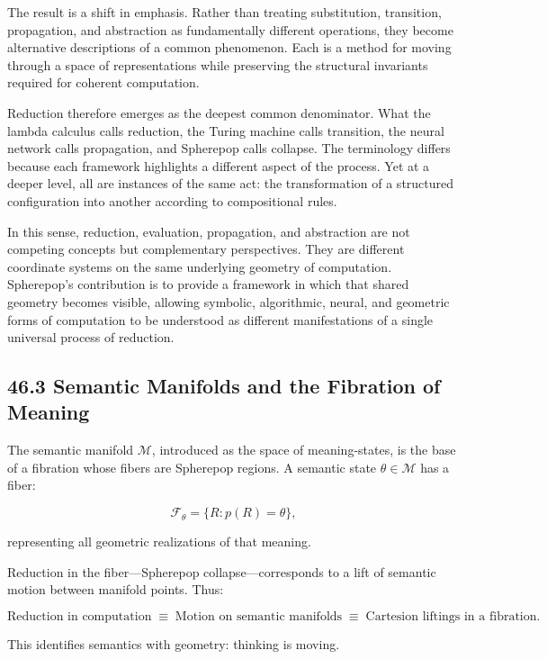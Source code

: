 \documentclass[12pt,letterpaper]{article}
\theoremstyle{remark}
\begin{document}
The result is a shift in emphasis. Rather than treating substitution, transition, propagation, and abstraction as fundamentally different operations, they become alternative descriptions of a common phenomenon. Each is a method for moving through a space of representations while preserving the structural invariants required for coherent computation.

Reduction therefore emerges as the deepest common denominator. What the lambda calculus calls reduction, the Turing machine calls transition, the neural network calls propagation, and Spherepop calls collapse. The terminology differs because each framework highlights a different aspect of the process. Yet at a deeper level, all are instances of the same act: the transformation of a structured configuration into another according to compositional rules.

In this sense, reduction, evaluation, propagation, and abstraction are not competing concepts but complementary perspectives. They are different coordinate systems on the same underlying geometry of computation. Spherepop's contribution is to provide a framework in which that shared geometry becomes visible, allowing symbolic, algorithmic, neural, and geometric forms of computation to be understood as different manifestations of a single universal process of reduction.

\subsection{46.3 Semantic Manifolds and the Fibration of Meaning}

The semantic manifold $\mathcal{M}$, introduced as the space of meaning-states,
is the base of a fibration whose fibers are Spherepop regions.  
A semantic state $\theta \in \mathcal{M}$ has a fiber:

\[
\mathcal{F}_\theta = \{ R : p(R) = \theta \},
\]

representing all geometric realizations of that meaning.

Reduction in the fiber—Spherepop collapse—corresponds to a lift of semantic motion 
between manifold points.  
Thus:

\[
\text{Reduction in computation}
\;\equiv\;
\text{Motion on semantic manifolds}
\;\equiv\;
\text{Cartesion liftings in a fibration}.
\]

This identifies semantics with geometry:  
thinking is moving.
\end{document}
